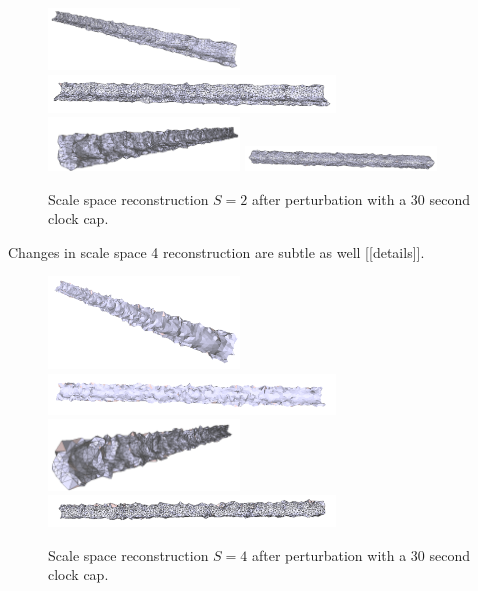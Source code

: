 \documentclass[12pt]{drexelthesis}
\begin{document}
\begin{figure}[!ht]
	
	\centering
		\includegraphics[width=2in]{simulated-lab-scan/2cmnoise/optimized/scalespace2perturb00.png}
		\includegraphics[width=3in]{simulated-lab-scan/2cmnoise/optimized/scalespace2perturb01.png}
		\includegraphics[width=2in]{simulated-lab-scan/2cmnoise/optimized/scalespace2perturb02.png}
		\includegraphics[width=2in]{simulated-lab-scan/2cmnoise/optimized/scalespace2perturb03.png}
		\caption[Scale space reconstruction $S = 2$ after perturbation with a 30 second clock cap]{\centering Scale space reconstruction $S = 2$ after perturbation with a 30 second clock cap.}
	\label{2cmnoise:scalespace2perturb}
\end{figure}

Changes in scale space 4 reconstruction are subtle as well [[details]].

\begin{figure}[!ht]
	\centering
		\includegraphics[width=2in]{simulated-lab-scan/2cmnoise/optimized/scalespace4perturb00.png}
		\includegraphics[width=3in]{simulated-lab-scan/2cmnoise/optimized/scalespace4perturb01.png}
		\includegraphics[width=2in]{simulated-lab-scan/2cmnoise/optimized/scalespace4perturb02.png}
		\includegraphics[width=3in]{simulated-lab-scan/2cmnoise/optimized/scalespace4perturb03.png}
		\caption[Scale space reconstruction $S = 4$ after perturbation with a 30 second clock cap]{\centering Scale space reconstruction $S = 4$ after perturbation with a 30 second clock cap.}
	\label{2cmnoise:scalespace4perturb}
\end{figure}
\end{document}
